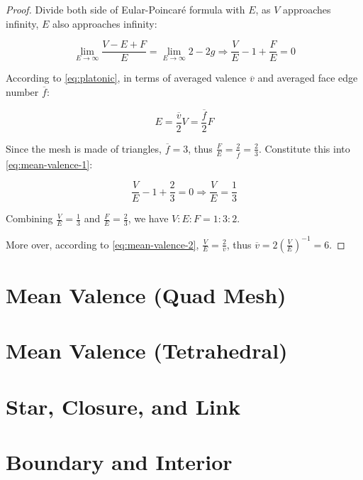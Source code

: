 \begin{proof}
    Divide both side of Eular-Poincar\'e formula with $E$, as $V$ approaches infinity, $E$ also approaches infinity:

    \begin{equation}
        \lim_{E \to \infty} \frac{V - E + F}{E} = \lim_{E \to \infty} 2 - 2g
        \Rightarrow \frac{V}{E} - 1 + \frac{F}{E} = 0
        \label{eq:mean-valence-1}
    \end{equation}

    According to \autoref{eq:platonic}, in terms of averaged valence $\overline{v}$ and averaged face edge number $\overline{f}$:

    \begin{equation}
        E = \frac{\overline{v}}{2} V = \frac{\overline{f}}{2} F
        \label{eq:mean-valence-2}
    \end{equation}

    Since the mesh is made of triangles, $\overline{f} = 3$, thus $\frac{F}{E} = \frac{2}{\overline{f}} = \frac{2}{3}$. Constitute this into \autoref{eq:mean-valence-1}:

    \begin{equation}
        \frac{V}{E} - 1 + \frac{2}{3} = 0
        \Rightarrow \frac{V}{E} = \frac{1}{3}
    \end{equation}

    Combining $\frac{V}{E} = \frac{1}{3}$ and $\frac{F}{E} = \frac{2}{3}$, we have $V:E:F = 1:3:2$.

    More over, according to \autoref{eq:mean-valence-2}, $\frac{V}{E} = \frac{2}{\overline{v}}$, thus $\overline{v} = 2(\frac{V}{E})^{-1} = 6$.
\end{proof}

\section{Mean Valence (Quad Mesh)}

\section{Mean Valence (Tetrahedral)}

\section{Star, Closure, and Link}

\section{Boundary and Interior}

